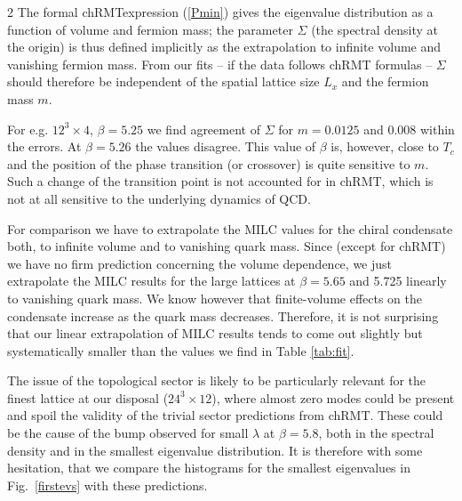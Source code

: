 \begin{multicols}{2}
The formal chRMT\space expression (\ref{Pmin}) gives the eigenvalue
distribution as a function of volume and fermion mass; the parameter $\Sigma$ 
(the spectral density at the origin) is thus defined implicitly as the
extrapolation to infinite volume and vanishing fermion mass. From our fits --
if the data follows chRMT formulas -- $\Sigma$ should therefore be independent
of the spatial lattice size $L_x$ and the fermion mass $m$. 

For e.g. $12^3\times 4$, $\beta=5.25$ we find agreement of  $\Sigma$ for
$m=0.0125 $ and 0.008 within the errors. At $\beta=5.26$ the values  disagree.
This value of $\beta$ is, however, close to $T_c$ and the position of the phase
transition (or crossover) is quite sensitive to $m$. Such a change of the
transition point is not accounted for in chRMT, which is not at all sensitive
to the underlying dynamics of QCD.

For comparison we have to extrapolate the MILC  values \cite{MILC96} for the
chiral condensate both, to infinite volume and to vanishing quark mass. Since
(except for chRMT) we have no firm prediction concerning the  volume
dependence, we just extrapolate the MILC results for the large lattices at
$\beta=5.65$ and 5.725 linearly to vanishing quark mass. We know however that
finite-volume effects on the condensate increase as the quark mass decreases.
Therefore, it is not surprising that our linear extrapolation of MILC results
tends to come out slightly but systematically smaller than the values we find
in Table \ref{tab:fit}. 

The issue of the topological sector is likely to be particularly relevant for
the finest lattice at our disposal ($24^3\times 12$), where almost zero modes
could be present and spoil the validity of the trivial sector predictions from
chRMT. These could be the cause of the bump observed for small $\lambda$ at
$\beta=5.8$, both in  the spectral density and in the smallest eigenvalue
distribution. It is therefore with some hesitation, that we compare the
histograms for the smallest  eigenvalues in Fig.~\ref{firstevs} with these
predictions.


\end{multicols}
